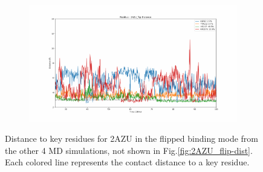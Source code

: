 \begin{figure}[!ht]
\begin{subfigure}{.45\textwidth}
  \end{subfigure}
    \begin{subfigure}{.45\textwidth}
     \centering
     \includegraphics[width=.95\linewidth]{chapter4/2AZU_flip/2AZU_flip-dist_3.pdf}
  \end{subfigure}
\caption{Distance to key residues for 2AZU in the flipped binding mode from the other 4 MD simulations, not shown in Fig.\ref{fig:2AZU_flip-dist}. Each colored line represents the contact distance to a key residue.}
\label{sup:2AZU_flip-dist}
\end{figure}  